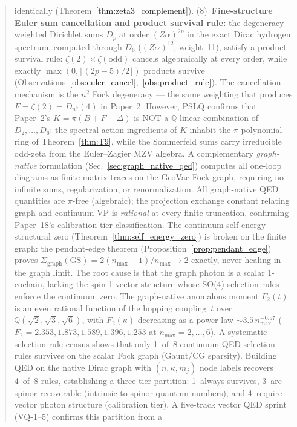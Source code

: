 \documentclass[11pt]{article}
\begin{document}
\begin{abstract}
identically (Theorem~\ref{thm:zeta3_complement}).
(8)~\textbf{Fine-structure Euler sum cancellation and product survival
rule:} the degeneracy-weighted Dirichlet sums $D_p$ at order
$(Z\alpha)^{2p}$ in the exact Dirac hydrogen spectrum, computed through
$D_6$ ($(Z\alpha)^{12}$, weight~11), satisfy a product survival rule:
$\zeta(2) \times \zeta(\mathrm{odd})$ cancels algebraically at every
order, while exactly $\max(0, \lfloor(2p{-}5)/2\rfloor)$ products
survive (Observations~\ref{obs:euler_cancel},~\ref{obs:product_rule}).
The cancellation mechanism is the $n^2$ Fock degeneracy --- the same
weighting that produces $F = \zeta(2) = D_{n^2}(4)$ in Paper~2.
However, PSLQ confirms that Paper~2's $K = \pi(B + F - \Delta)$ is NOT
a $\mathbb{Q}$-linear combination of $D_2, \ldots, D_6$: the
spectral-action ingredients of $K$ inhabit the $\pi$-polynomial ring of
Theorem~\ref{thm:T9}, while the Sommerfeld sums carry irreducible
odd-zeta from the Euler--Zagier MZV algebra.
A complementary \emph{graph-native} formulation
(Sec.~\ref{sec:graph_native_qed}) computes all one-loop diagrams as
finite matrix traces on the GeoVac Fock graph, requiring no infinite
sums, regularization, or renormalization.  All graph-native QED
quantities are $\pi$-free (algebraic); the projection exchange constant
relating graph and continuum VP is \emph{rational} at every finite
truncation, confirming Paper~18's calibration-tier classification.
The continuum self-energy structural zero (Theorem~\ref{thm:self_energy_zero})
is broken on the finite graph: the pendant-edge theorem
(Proposition~\ref{prop:pendant_edge}) proves
$\Sigma_{\mathrm{graph}}(\mathrm{GS}) = 2(n_{\max}-1)/n_{\max} \to 2$
exactly, never healing in the graph limit.  The root cause is that the
graph photon is a scalar 1-cochain, lacking the spin-1 vector structure
whose SO(4) selection rules enforce the continuum zero.
The graph-native anomalous moment $F_2(t)$ is an even rational function
of the hopping coupling~$t$ over $\mathbb{Q}(\sqrt{2},\sqrt{3},\sqrt{6})$,
with $F_2(\kappa)$ decreasing as a power law $\sim 3.5\, n_{\max}^{-0.57}$
($F_2 = 2.353, 1.873, 1.589, 1.396, 1.253$ at $n_{\max} = 2, \ldots, 6$).
A systematic selection rule census shows that only 1~of~8 continuum QED
selection rules survives on the scalar Fock graph (Gaunt/CG sparsity).
Building QED on the native Dirac graph with $(n, \kappa, m_j)$ node
labels recovers 4~of~8 rules, establishing a three-tier partition:
1~always survives, 3~are spinor-recoverable (intrinsic to spinor quantum
numbers), and 4~require vector photon structure (calibration tier).
A five-track vector QED sprint (VQ-1--5) confirms this partition from a

\end{abstract}
\end{document}
